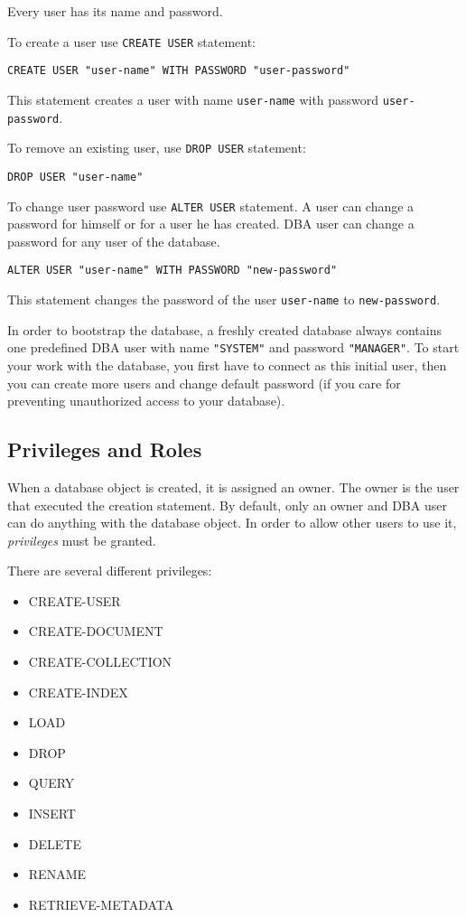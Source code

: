 \documentclass[a4paper,12pt]{article}
\begin{document}
Every user has its name and password.

To create a user use \verb!CREATE USER! statement:

\begin{verbatim}
CREATE USER "user-name" WITH PASSWORD "user-password"
\end{verbatim}

This statement creates a user with name \verb!user-name! with password \verb!user-password!.

To remove an existing user, use \verb!DROP USER! statement:

\begin{verbatim}
DROP USER "user-name"
\end{verbatim}

To change user password use \verb!ALTER USER! statement. A user can change a password for himself or for a user he has created. DBA user can change a password for any user of the database.

\begin{verbatim}
ALTER USER "user-name" WITH PASSWORD "new-password"
\end{verbatim}

This statement changes the password of the user \verb!user-name! to \verb!new-password!.

In order to bootstrap the database, a freshly created database always contains one predefined DBA user with name \verb!"SYSTEM"! and password \verb!"MANAGER"!. To start your work with the database, you first have to connect as this initial user, then you can create more users and change default password (if you care for preventing unauthorized access to your database).

\subsection{Privileges and Roles}
\label{roles}

When a database object is created, it is assigned an owner. The owner is the user that executed the creation statement. By default, only an owner and DBA user can do anything with the database object. In order to allow other users to use it, \emph{privileges} must be granted.

There are several different privileges: 
\begin{itemize}
\item CREATE-USER
\item CREATE-DOCUMENT
\item CREATE-COLLECTION
\item CREATE-INDEX
\item LOAD
\item DROP
\item QUERY
\item INSERT
\item DELETE
\item RENAME
\item RETRIEVE-METADATA
\end{itemize}
\end{document}
